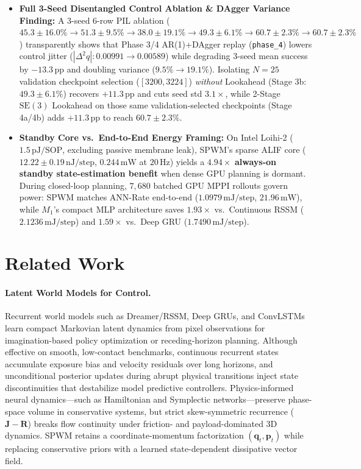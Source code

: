 \documentclass[11pt]{article}
\begin{document}
\begin{itemize}
    \item \textbf{Full 3-Seed Disentangled Control Ablation \& DAgger Variance Finding:} A 3-seed 6-row PIL ablation ($45.3 \pm 16.0\% \to 51.3 \pm 9.5\% \to 38.0 \pm 19.1\% \to 49.3 \pm 6.1\% \to 60.7 \pm 2.3\% \to 60.7 \pm 2.3\%$) transparently shows that Phase 3/4 AR(1)+DAgger replay (\texttt{phase\_4}) lowers control jitter ($|\Delta^2 q|: 0.00991 \to 0.00589$) while degrading 3-seed mean success by $-13.3\,\text{pp}$ and doubling variance ($9.5\% \to 19.1\%$). Isolating $N=25$ validation checkpoint selection ($[3200, 3224]$) \emph{without} Lookahead (Stage 3b: $49.3 \pm 6.1\%$) recovers $+11.3\,\text{pp}$ and cuts seed std $3.1\times$, while 2-Stage $\text{SE}(3)$ Lookahead on those same validation-selected checkpoints (Stage 4a/4b) adds $+11.3\,\text{pp}$ to reach $60.7 \pm 2.3\%$.
    \item \textbf{Standby Core vs.\ End-to-End Energy Framing:} On Intel Loihi-2 ($1.5\,\text{pJ/SOP}$, excluding passive membrane leak), SPWM's sparse ALIF core ($12.22 \pm 0.19\,\text{nJ/step}$, $0.244\,\text{mW}$ at $20\,\text{Hz}$) yields a $4.94\times$ \textbf{always-on standby state-estimation benefit} when dense GPU planning is dormant. During closed-loop planning, $7{,}680$ batched GPU MPPI rollouts govern power: SPWM matches ANN-Rate end-to-end ($1.0979\,\text{mJ/step}$, $21.96\,\text{mW}$), while $M_1$'s compact MLP architecture saves $1.93\times$ vs.\ Continuous RSSM ($2.1236\,\text{mJ/step}$) and $1.59\times$ vs.\ Deep GRU ($1.7490\,\text{mJ/step}$).
\end{itemize}

\section{Related Work}

\paragraph{Latent World Models for Control.} Recurrent world models such as Dreamer/RSSM, Deep GRUs, and ConvLSTMs learn compact Markovian latent dynamics from pixel observations for imagination-based policy optimization or receding-horizon planning. Although effective on smooth, low-contact benchmarks, continuous recurrent states accumulate exposure bias and velocity residuals over long horizons, and unconditional posterior updates during abrupt physical transitions inject state discontinuities that destabilize model predictive controllers. Physics-informed neural dynamics---such as Hamiltonian and Symplectic networks---preserve phase-space volume in conservative systems, but strict skew-symmetric recurrence ($\mathbf{J} - \mathbf{R}$) breaks flow continuity under friction- and payload-dominated 3D dynamics. SPWM retains a coordinate-momentum factorization $(\mathbf{q}_t, \mathbf{p}_t)$ while replacing conservative priors with a learned state-dependent dissipative vector field.
\end{document}
